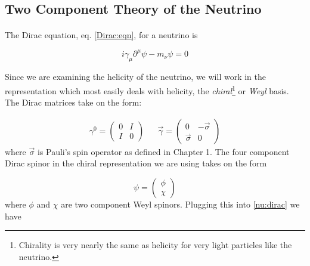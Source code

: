 \documentclass[a4paper,12pt]{book}
\begin{document}
\subsection{Two Component Theory of the Neutrino}

\paragraph{}The Dirac equation, eq. \ref{Dirac:eqn}, for a neutrino is

\begin{equation}\label{nu:dirac}
 i\gamma_{\mu}\partial^{\mu}\psi-m_{\nu}\psi=0
\end{equation}

Since we are examining the helicity of the neutrino, we will work in the representation which most easily deals with helicity, the \emph{chiral}\footnote{Chirality is very nearly the same as helicity for very light particles like the neutrino.} or \emph{Weyl} basis. The Dirac matrices take on the form:

\begin{align}
\gamma^{0}=\left( \begin{array}{cc}
0 & I \\
I & 0 \end{array} \right) &&
\vec{\gamma}=\left( \begin{array}{cc}
0 & -\vec{\sigma} \\
\vec{\sigma} & 0 \end{array} \right)
\end{align}
where $\vec{\sigma}$ is Pauli's spin operator as defined in Chapter 1. The four component Dirac spinor in the chiral representation we are using takes on the form

\begin{equation}
 \psi=\left( \begin{array}{c}
\phi \\
\chi \end{array} \right)
\end{equation}
where $\phi$ and $\chi$ are two component Weyl spinors. Plugging this into \ref{nu:dirac} we have
\end{document}
